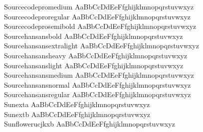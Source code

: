 \begin{tabbing}
Sourcecodepromedium \> { AaBbCcDdEeFfghijklmnopqrstuvwxyz} \\
Sourcecodeproregular \> { AaBbCcDdEeFfghijklmnopqrstuvwxyz} \\
Sourcecodeprosemibold \> { AaBbCcDdEeFfghijklmnopqrstuvwxyz} \\
Sourcehansansbold \> { AaBbCcDdEeFfghijklmnopqrstuvwxyz} \\
Sourcehansansextralight \> { AaBbCcDdEeFfghijklmnopqrstuvwxyz} \\
Sourcehansansheavy \> { AaBbCcDdEeFfghijklmnopqrstuvwxyz} \\
Sourcehansanslight \> { AaBbCcDdEeFfghijklmnopqrstuvwxyz} \\
Sourcehansansmedium \> { AaBbCcDdEeFfghijklmnopqrstuvwxyz} \\
Sourcehansansnormal \> { AaBbCcDdEeFfghijklmnopqrstuvwxyz} \\
Sourcehansansregular \> { AaBbCcDdEeFfghijklmnopqrstuvwxyz} \\
Sunexta \> { AaBbCcDdEeFfghijklmnopqrstuvwxyz} \\
Sunextb \> { AaBbCcDdEeFfghijklmnopqrstuvwxyz} \\
Sunflowerucjkxb \> { AaBbCcDdEeFfghijklmnopqrstuvwxyz} \\

\end{tabbing}
